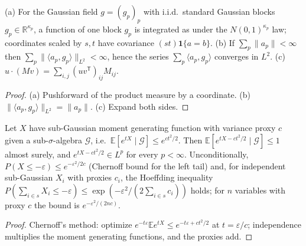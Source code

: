 \begin{lemma}\label{lem:sg:gaussian-support}
  \leanok
(a) For the Gaussian field $g=(g_p)_p$ with i.i.d.\ standard Gaussian blocks $g_p\in\mathbb R^{\kappa_p}$, a function of one block $g_p$ is integrated as under the
$N(0,1)^{\kappa_p}$ law; coordinates scaled by $s, t$ have covariance $(s t) \mathbf 1\{a = b\}$. (b) If $\sum_p\|a_p\|<\infty$ then $\sum_p\|\langle a_p,g_p\rangle\|_{L^2}<\infty$, hence the series $\sum_p\langle a_p,g_p\rangle$ converges in $L^2$.
(c) $u\cdot(Mv)=\sum_{i,j}(uv^{\mathsf T})_{ij}M_{ij}$.
\end{lemma}
\begin{proof}
  \leanok
(a) Pushforward of the product measure by a coordinate. (b) $\|\langle a_p,g_p\rangle\|_{L^2}=\|a_p\|$. (c) Expand both sides.
\end{proof}

\begin{lemma}\label{lem:sg:subgaussian}
  \leanok
Let $X$ have sub-Gaussian moment generating function with variance proxy $c$ given a sub-$\sigma$-algebra $\mathcal G$, i.e.\ $\mathbb E[e^{tX}\mid\mathcal G]\le e^{ct^2/2}$.
Then $\mathbb E[e^{tX-ct^2/2}\mid\mathcal G]\le1$ almost surely, and $e^{tX-ct^2/2}\in L^p$ for every $p<\infty$.
Unconditionally, $P(X\le-\varepsilon)\le e^{-\varepsilon^2/2c}$ (Chernoff bound for the left tail) and, for independent sub-Gaussian $X_i$ with proxies $c_i$,
the Hoeffding inequality $P(\sum_{i\in s}X_i\le-\varepsilon)\le\exp(-\varepsilon^2/(2\sum_{i\in s}c_i))$ holds; for $n$ variables with proxy $c$ the bound is $e^{-\varepsilon^2/(2nc)}$.
\end{lemma}
\begin{proof}
  \leanok
Chernoff's method: optimize $e^{-t\varepsilon}\mathbb E e^{tX}\le e^{-t\varepsilon+ct^2/2}$ at $t=\varepsilon/c$; independence multiplies the moment generating functions, and the proxies add.
\end{proof}

